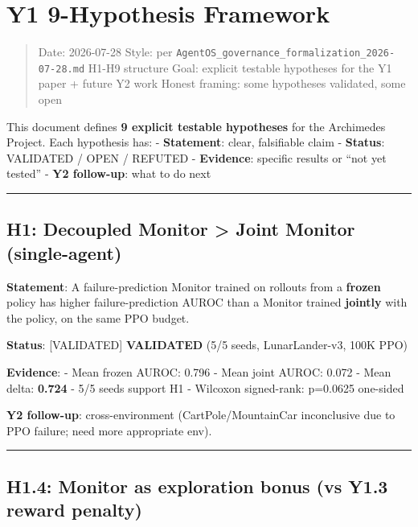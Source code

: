 \documentclass[
]{article}
\author{}
\date{}
\begin{document}
\section{Y1 9-Hypothesis Framework}\label{y1-9-hypothesis-framework}

\begin{quote}
Date: 2026-07-28 Style: per
\texttt{AgentOS\_governance\_formalization\_2026-07-28.md} H1-H9
structure Goal: explicit testable hypotheses for the Y1 paper + future
Y2 work Honest framing: some hypotheses validated, some open
\end{quote}

This document defines \textbf{9 explicit testable hypotheses} for the
Archimedes Project. Each hypothesis has: - \textbf{Statement}: clear,
falsifiable claim - \textbf{Status}: VALIDATED / OPEN / REFUTED -
\textbf{Evidence}: specific results or ``not yet tested'' - \textbf{Y2
follow-up}: what to do next

\begin{center}\rule{0.5\linewidth}{0.5pt}\end{center}

\subsection{H1: Decoupled Monitor \textgreater{} Joint Monitor
(single-agent)}\label{h1-decoupled-monitor-joint-monitor-single-agent}

\textbf{Statement}: A failure-prediction Monitor trained on rollouts
from a \textbf{frozen} policy has higher failure-prediction AUROC than a
Monitor trained \textbf{jointly} with the policy, on the same PPO
budget.

\textbf{Status}: {[}VALIDATED{]} \textbf{VALIDATED} (5/5 seeds,
LunarLander-v3, 100K PPO)

\textbf{Evidence}: - Mean frozen AUROC: 0.796 - Mean joint AUROC: 0.072
- Mean delta: \textbf{0.724} - 5/5 seeds support H1 - Wilcoxon
signed-rank: p=0.0625 one-sided

\textbf{Y2 follow-up}: cross-environment (CartPole/MountainCar
inconclusive due to PPO failure; need more appropriate env).

\begin{center}\rule{0.5\linewidth}{0.5pt}\end{center}

\subsection{H1.4: Monitor as exploration bonus (vs Y1.3 reward
penalty)}\label{h1.4-monitor-as-exploration-bonus-vs-y1.3-reward-penalty}
\end{document}
